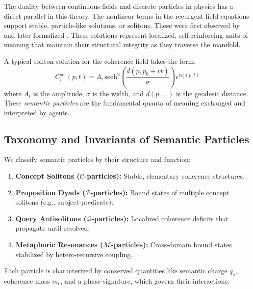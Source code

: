 The duality between continuous fields and discrete particles in physics has a direct parallel in this theory. The nonlinear terms in the recurgent field equations support stable, particle-like solutions, or solitons. These were first observed by \autocite{Russell1845} and later formalized \autocite{KortewegdeVries1895, ZabuskyKruskal1965}. These solutions represent localized, self-reinforcing units of meaning that maintain their structural integrity as they traverse the manifold.

A typical soliton solution for the coherence field takes the form:
\begin{equation}
C_i^{\mathrm{sol}}(p, t) = A_i\, \mathrm{sech}^2\left(\frac{d(p, p_0 + vt)}{\sigma}\right) e^{i\phi_i(p, t)}
\end{equation}
where \(A_i\) is the amplitude, \(\sigma\) is the width, and \(d(p, \dots)\) is the geodesic distance. These \textit{semantic particles} are the fundamental quanta of meaning exchanged and interpreted by agents.


\subsection{Taxonomy and Invariants of Semantic Particles}

We classify semantic particles by their structure and function:
\begin{enumerate}
    \item \textbf{Concept Solitons (\(\mathcal{C}\)-particles):} Stable, elementary coherence structures.
    \item \textbf{Proposition Dyads (\(\mathcal{P}\)-particles):} Bound states of multiple concept solitons (e.g., subject-predicate).
    \item \textbf{Query Antisolitons (\(\mathcal{Q}\)-particles):} Localized coherence deficits that propagate until resolved.
    \item \textbf{Metaphoric Resonances (\(\mathcal{M}\)-particles):} Cross-domain bound states stabilized by hetero-recursive coupling.
\end{enumerate}
Each particle is characterized by conserved quantities like semantic charge \(q_s\), coherence mass \(m_c\), and a phase signature, which govern their interactions.


